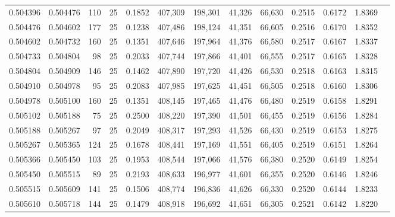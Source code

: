 \begin{tabular}{rrrrrrrrrrrrr}
0.504396 & 0.504476 &   110 &  25 &                                     0.1852 & 407,309 & 198,301 &  41,326 &  66,630 & 0.2515 & 0.6172 & 1.8369 \\
0.504476 & 0.504602 &   177 &  25 &                                     0.1238 & 407,486 & 198,124 &  41,351 &  66,605 & 0.2516 & 0.6170 & 1.8352 \\
0.504602 & 0.504732 &   160 &  25 &                                     0.1351 & 407,646 & 197,964 &  41,376 &  66,580 & 0.2517 & 0.6167 & 1.8337 \\
0.504733 & 0.504804 &    98 &  25 &                                     0.2033 & 407,744 & 197,866 &  41,401 &  66,555 & 0.2517 & 0.6165 & 1.8328 \\
0.504804 & 0.504909 &   146 &  25 &                                     0.1462 & 407,890 & 197,720 &  41,426 &  66,530 & 0.2518 & 0.6163 & 1.8315 \\
0.504910 & 0.504978 &    95 &  25 &                                     0.2083 & 407,985 & 197,625 &  41,451 &  66,505 & 0.2518 & 0.6160 & 1.8306 \\
0.504978 & 0.505100 &   160 &  25 &                                     0.1351 & 408,145 & 197,465 &  41,476 &  66,480 & 0.2519 & 0.6158 & 1.8291 \\
0.505102 & 0.505188 &    75 &  25 &                                     0.2500 & 408,220 & 197,390 &  41,501 &  66,455 & 0.2519 & 0.6156 & 1.8284 \\
0.505188 & 0.505267 &    97 &  25 &                                     0.2049 & 408,317 & 197,293 &  41,526 &  66,430 & 0.2519 & 0.6153 & 1.8275 \\
0.505267 & 0.505365 &   124 &  25 &                                     0.1678 & 408,441 & 197,169 &  41,551 &  66,405 & 0.2519 & 0.6151 & 1.8264 \\
0.505366 & 0.505450 &   103 &  25 &                                     0.1953 & 408,544 & 197,066 &  41,576 &  66,380 & 0.2520 & 0.6149 & 1.8254 \\
0.505450 & 0.505515 &    89 &  25 &                                     0.2193 & 408,633 & 196,977 &  41,601 &  66,355 & 0.2520 & 0.6146 & 1.8246 \\
0.505515 & 0.505609 &   141 &  25 &                                     0.1506 & 408,774 & 196,836 &  41,626 &  66,330 & 0.2520 & 0.6144 & 1.8233 \\
0.505610 & 0.505718 &   144 &  25 &                                     0.1479 & 408,918 & 196,692 &  41,651 &  66,305 & 0.2521 & 0.6142 & 1.8220 \\

\end{tabular}
